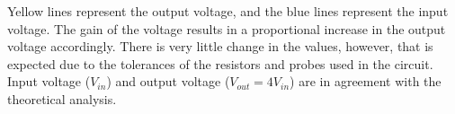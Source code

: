 Yellow lines represent the output voltage, and the blue lines represent the input voltage. The gain of the voltage results in a proportional increase in the output voltage accordingly. There is very little change in the values, however, that is expected due to the tolerances of the resistors and probes used in the circuit. Input voltage ($V_{in}$) and output voltage ($V_{out} = 4V_{in}$) are in agreement with the theoretical analysis.
